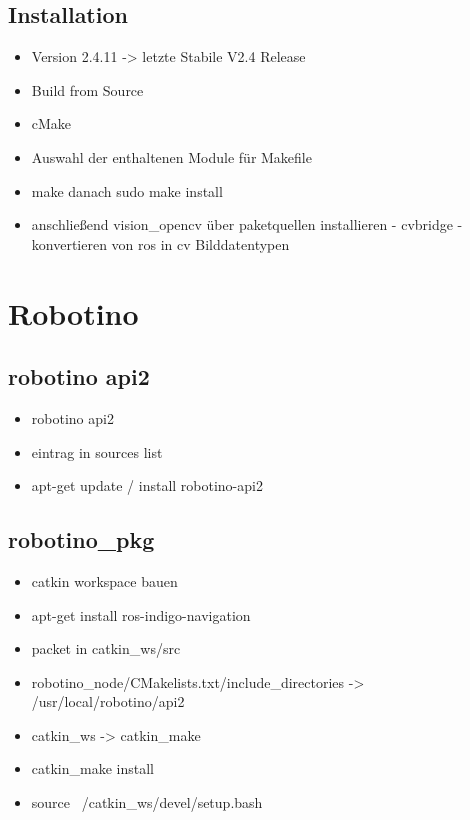		\subsection{Installation}
			\begin{itemize}
			\item Version 2.4.11 -> letzte Stabile V2.4 Release
			\item Build from Source
			\item cMake
			\item Auswahl der enthaltenen Module für Makefile
			\item make danach sudo make install
			\item anschließend vision\_opencv über paketquellen installieren - cvbridge - konvertieren von ros in cv Bilddatentypen
			\end{itemize}
	\section{Robotino}
		\subsection{robotino api2}
		\begin{itemize}
		\item robotino api2
		\item eintrag in sources list
		\item apt-get update / install robotino-api2
		\end{itemize}
		\subsection{robotino\_pkg}
		\begin{itemize}
		\item catkin workspace bauen
		\item apt-get install ros-indigo-navigation
		\item packet in catkin\_ws/src
		\item robotino\_node/CMakelists.txt/include\_directories -> /usr/local/robotino/api2
		\item catkin\_ws -> catkin\_make
		\item catkin\_make install
		\item source ~/catkin\_ws/devel/setup.bash
		\end{itemize}
		
		